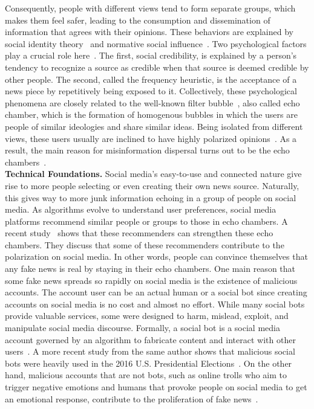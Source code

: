 Consequently, people with different views tend to form separate groups, which makes them feel safer, leading to the consumption and dissemination of information that agrees with their opinions. These behaviors are explained by social identity theory~\parencite{SocialIdentityTheory_Ashforth} and normative social influence~\parencite{NormativeSocialInfluence_Asch}. Two psychological factors play a crucial role here~\parencite{TheRussianFirehoseOfFalsehood_Paul}. The first, social credibility, is explained by a person’s tendency to recognize a source as credible when that source is deemed credible by other people. The second, called the frequency heuristic, is the acceptance of a news piece by repetitively being exposed to it. Collectively, these psychological phenomena are closely related to the well-known filter bubble~\parencite{TheFilterBubble_Pariser}, also called echo chamber, which is the formation of homogenous bubbles in which the users are people of similar ideologies and share similar ideas. Being isolated from different views, these users usually are inclined to have highly polarized opinions~\parencite{EchoChambers_Sunstein}. As a result, the main reason for misinformation dispersal turns out to be the echo chambers~\parencite{TheSpreadingOfMisinformationOnline_DelVicario}.\\
\textbf{Technical Foundations.} Social media's easy-to-use and connected nature give rise to more people selecting or even creating their own news source. Naturally, this gives way to more junk information echoing in a group of people on social media. As algorithms evolve to understand user preferences, social media platforms recommend similar people or groups to those in echo chambers. A recent study~\parencite{TheEffectOfPeopleRecommenderOnEchoChambers_Cinus}  shows that these recommenders can strengthen these echo chambers. They discuss that some of these recommenders contribute to the polarization on social media. In other words, people can convince themselves that any fake news is real by staying in their echo chambers. One main reason that some fake news spreads so rapidly on social media is the existence of malicious accounts. The account user can be an actual human or a social bot since creating accounts on social media is no cost and almost no effort. While many social bots provide valuable services, some were designed to harm, mislead, exploit, and manipulate social media discourse. Formally, a social bot is a social media account governed by an algorithm to fabricate content and interact with other users~\parencite{TheRiseOfSocialBots_Ferrara}. A more recent study from the same author shows that malicious social bots were heavily used in the 2016 U.S. Presidential Elections~\parencite{SocialBotsDistortThe2016USPresidentialElection_Bessi}. On the other hand, malicious accounts that are not bots, such as online trolls who aim to trigger negative emotions and humans that provoke people on social media to get an emotional response, contribute to the proliferation of fake news~\parencite{AnyoneCanBecomeATroll_Cheng}.\\
